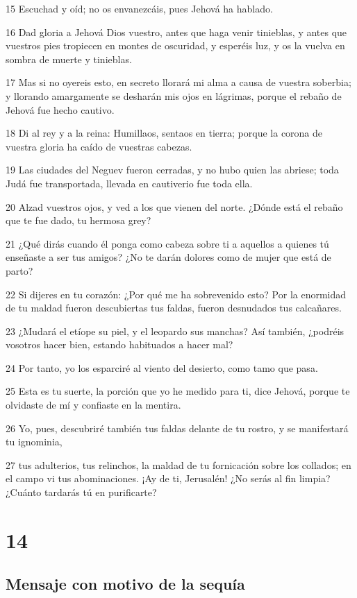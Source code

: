 \par 15 Escuchad y oíd; no os envanezcáis, pues Jehová ha hablado.
\par 16 Dad gloria a Jehová Dios vuestro, antes que haga venir tinieblas, y antes que vuestros pies tropiecen en montes de oscuridad, y esperéis luz, y os la vuelva en sombra de muerte y tinieblas.
\par 17 Mas si no oyereis esto, en secreto llorará mi alma a causa de vuestra soberbia; y llorando amargamente se desharán mis ojos en lágrimas, porque el rebaño de Jehová fue hecho cautivo.
\par 18 Di al rey y a la reina: Humillaos, sentaos en tierra; porque la corona de vuestra gloria ha caído de vuestras cabezas.
\par 19 Las ciudades del Neguev fueron cerradas, y no hubo quien las abriese; toda Judá fue transportada, llevada en cautiverio fue toda ella.
\par 20 Alzad vuestros ojos, y ved a los que vienen del norte. ¿Dónde está el rebaño que te fue dado, tu hermosa grey?
\par 21 ¿Qué dirás cuando él ponga como cabeza sobre ti a aquellos a quienes tú enseñaste a ser tus amigos? ¿No te darán dolores como de mujer que está de parto?
\par 22 Si dijeres en tu corazón: ¿Por qué me ha sobrevenido esto? Por la enormidad de tu maldad fueron descubiertas tus faldas, fueron desnudados tus calcañares.
\par 23 ¿Mudará el etíope su piel, y el leopardo sus manchas? Así también, ¿podréis vosotros hacer bien, estando habituados a hacer mal?
\par 24 Por tanto, yo los esparciré al viento del desierto, como tamo que pasa.
\par 25 Esta es tu suerte, la porción que yo he medido para ti, dice Jehová, porque te olvidaste de mí y confiaste en la mentira.
\par 26 Yo, pues, descubriré también tus faldas delante de tu rostro, y se manifestará tu ignominia,
\par 27 tus adulterios, tus relinchos, la maldad de tu fornicación sobre los collados; en el campo vi tus abominaciones. ¡Ay de ti, Jerusalén! ¿No serás al fin limpia? ¿Cuánto tardarás tú en purificarte?

\chapter{14}

\section*{Mensaje con motivo de la sequía}

